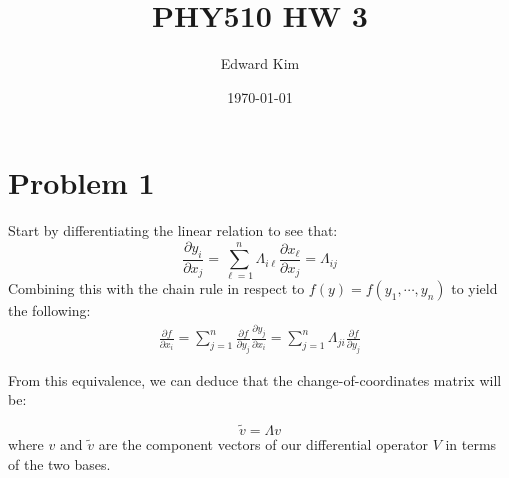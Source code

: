 \documentclass[12pt]{article}%
\title{PHY510 HW 3}
\author{Edward Kim}
\date{\today}
\begin{document}
\maketitle

\section*{Problem 1}
Start by differentiating the linear relation to see that:
\[ \frac{\partial y_i}{\partial x_j} = \sum_{\ell = 1}^n \Lambda_{i\ell} \frac{\partial x_\ell}{\partial x_j} = \Lambda_{ij} \]
Combining this with the chain rule in respect to $f(y) = f(y_1,\cdots, y_n)$ to yield the following:
\begin{align*}
\frac{\partial f}{\partial x_i} =  \sum_{j = 1}^n \frac{\partial f}{\partial y_j} \frac{\partial y_j}{\partial x_i} =  \sum_{j = 1}^n \Lambda_{ji} \frac{\partial f}{\partial y_j}
\end{align*}

From this equivalence, we can deduce that the change-of-coordinates matrix will be:

\[ \tilde{v} = \Lambda v \] where $v$ and $\tilde{v}$ are the component vectors of our differential operator $V$ in terms of the two bases.
\end{document}
